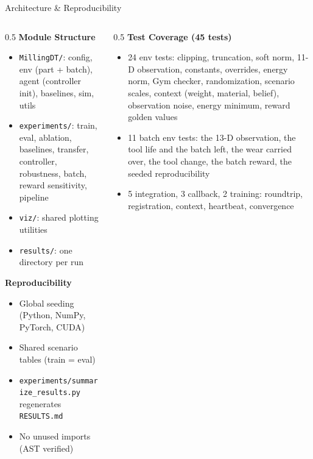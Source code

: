 ﻿\documentclass[11pt,aspectratio=169]{beamer}
\begin{document}
\begin{frame}{Architecture \& Reproducibility}
    \footnotesize
    \begin{columns}[T]
        \begin{column}{0.5\textwidth}
            \textbf{Module Structure}
            \begin{itemize}
                \item \texttt{MillingDT/}: config, env (part + batch), agent (controller init), baselines, sim, utils
                \item \texttt{experiments/}: train, eval, ablation, baselines, transfer, controller, robustness, batch, reward sensitivity, pipeline
                \item \texttt{viz/}: shared plotting utilities
                \item \texttt{results/}: one directory per run
            \end{itemize}

            \textbf{Reproducibility}
            \begin{itemize}
                \item Global seeding (Python, NumPy, PyTorch, CUDA)
                \item Shared scenario tables (train = eval)
                \item \texttt{experiments/summarize\_results.py} regenerates \texttt{RESULTS.md}
                \item No unused imports (AST verified)
            \end{itemize}
        \end{column}
        \begin{column}{0.5\textwidth}
            \textbf{Test Coverage (45 tests)}
            \begin{itemize}
                \item 24 env tests: clipping, truncation, soft norm, 11-D observation, constants, overrides, energy norm, Gym checker, randomization, scenario scales, context (weight, material, belief), observation noise, energy minimum, reward golden values
                \item 11 batch env tests: the 13-D observation, the tool life and the batch left, the wear carried over, the tool change, the batch reward, the seeded reproducibility
                \item 5 integration, 3 callback, 2 training: roundtrip, registration, context, heartbeat, convergence
            \end{itemize}
        \end{column}
    \end{columns}
\end{frame}
\end{document}
